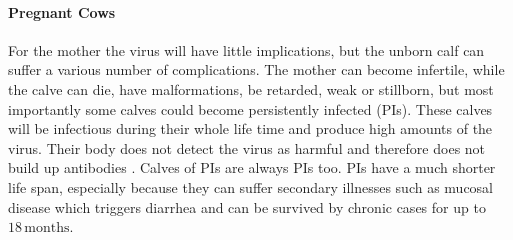 \paragraph{Pregnant Cows}
For the mother the virus will have little implications, but the unborn calf can suffer a various number of complications. The mother can become infertile, while the calve can die, have malformations, be retarded, weak or stillborn, but most importantly some calves could become persistently infected (PIs). These calves will be infectious during their whole life time and produce high amounts of the virus. Their body does not detect the virus as harmful and therefore does not build up antibodies \citep{personalCom}. Calves of PIs are always PIs too. PIs have a much shorter life span, especially because they can suffer secondary illnesses such as mucosal disease which triggers diarrhea and can be survived by chronic cases for up to $18\,\text{months}$.

